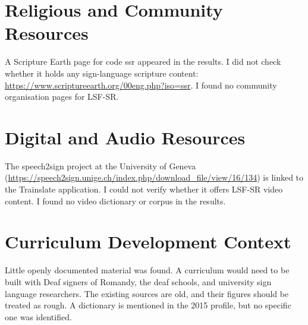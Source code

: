 \documentclass[12pt]{article}
\begin{document}
\section{Religious and Community Resources}
A Scripture Earth page for code ssr appeared in the results. I did not check whether it holds any sign-language scripture content: \url{https://www.scriptureearth.org/00eng.php?iso=ssr}. I found no community organisation pages for LSF-SR.

\section{Digital and Audio Resources}
The speech2sign project at the University of Geneva (\url{https://speech2sign.unige.ch/index.php/download_file/view/16/134}) is linked to the Trainslate application. I could not verify whether it offers LSF-SR video content. I found no video dictionary or corpus in the results.

\section{Curriculum Development Context}
Little openly documented material was found. A curriculum would need to be built with Deaf signers of Romandy, the deaf schools, and university sign language researchers. The existing sources are old, and their figures should be treated as rough. A dictionary is mentioned in the 2015 profile, but no specific one was identified.
\end{document}
